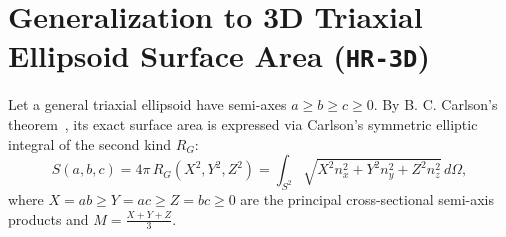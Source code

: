 \documentclass[11pt,a4paper]{article}
\theoremstyle{spacious}
\theoremstyle{spaciousdef}
\begin{document}
\section{Generalization to 3D Triaxial Ellipsoid Surface Area (\texttt{HR-3D})}

Let a general triaxial ellipsoid have semi-axes $a \ge b \ge c \ge 0$. By B. C. Carlson's theorem~\cite{Carlson1995}, its exact surface area is expressed via Carlson's symmetric elliptic integral of the second kind $R_G$:
\begin{equation}\label{eq:carlson_rg}
S(a,b,c) = 4\pi\,R_G(X^2, Y^2, Z^2) = \int_{S^2}\sqrt{X^2 n_x^2 + Y^2 n_y^2 + Z^2 n_z^2}\,d\Omega,
\end{equation}
where $X = ab \ge Y = ac \ge Z = bc \ge 0$ are the principal cross-sectional semi-axis products and $M = \frac{X+Y+Z}{3}$.
\end{document}
